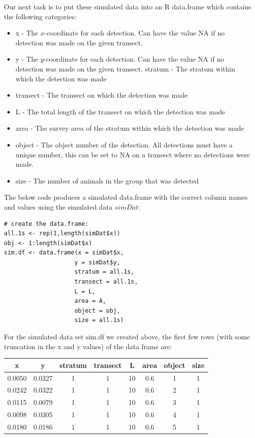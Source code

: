 \documentclass[11pt]{article}
\begin{document}
\begin{multicols}{2}
Our next task is to put these simulated data into an R data.frame which contains the following categories:

\begin{itemize}
\item x - The $x$-coordinate for each detection. Can have the value NA if no detection was made on the given transect.
\item y - The $y$-coordinate for each detection. Can have the value NA if no detection was made on the given transect.
stratum - The stratum within which the detection was made
\item transect - The transect on which the detection was made
\item L - The total length of the transect on which the detection was made
\item area - The survey area of the stratum within which the detection was made
\item object - The object number of the detection. All detections must have a unique number, this can be set to NA on a transect where no detections were made.
\item size - The number of animals in the group that was detected
\end{itemize}

The below code produces a simulated data.frame with the correct column names and values using the simulated data $simDat$:

\begingroup
\small
\begin{lstlisting}
# create the data.frame:
all.1s <- rep(1,length(simDat$x))
obj <- 1:length(simDat$x)
sim.df <- data.frame(x = simDat$x,
                    y = simDat$y,
                    stratum = all.1s,
                    transect = all.1s,
                    L = L,
                    area = A,
                    object = obj,
                    size = all.1s)
\end{lstlisting}
\endgroup

For the simulated data set sim.df we created above, the first few rows (with some truncation in the x and y values) of the data frame are:

\begin{center}
\tabcolsep=0.07cm
 \begin{tabular}{||c c c c c c c c||} 
 \hline
 x & y & stratum & transect & L & area & object & size\\ [0.5ex] 
 \hline\hline
 0.0050 & 0.0327 & 1 & 1 & 10 & 0.6 & 1 & 1 \\ 
 \hline
 0.0242 & 0.0322 & 1 & 1 & 10 & 0.6 & 2 & 1 \\
 \hline
 0.0115 & 0.0079 & 1 & 1 & 10 & 0.6 & 3 & 1 \\
 \hline
 0.0098 & 0.0305 & 1 & 1 & 10 & 0.6 & 4 & 1 \\
 \hline
 0.0180 & 0.0186 & 1 & 1 & 10 & 0.6 & 5 & 1 \\
 \hline
\end{tabular}
\end{center}


\end{multicols}
\end{document}
